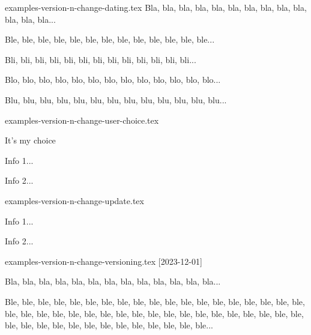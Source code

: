 

\begin{filecontents*}[overwrite]{examples-version-n-change-dating.tex}
Bla, bla, bla, bla, bla, bla, bla, bla, bla, bla, bla, bla, bla...

\medskip %


Ble, ble, ble, ble, ble, ble, ble, ble, ble, ble, ble, ble, ble...

\medskip %


Bli, bli, bli, bli, bli, bli, bli, bli, bli, bli, bli, bli, bli...

Blo, blo, blo, blo, blo, blo, blo, blo, blo, blo, blo, blo, blo...

Blu, blu, blu, blu, blu, blu, blu, blu, blu, blu, blu, blu, blu...
\end{filecontents*}


\begin{filecontents*}[overwrite]{examples-version-n-change-user-choice.tex}
\begin{tdoctopic}{It's my choice}
    \item Info 1...
    \item Info 2...
\end{tdoctopic}
\end{filecontents*}


\begin{filecontents*}[overwrite]{examples-version-n-change-update.tex}
\begin{tdocupdate}
    \item Info 1...
    \item Info 2...
\end{tdocupdate}
\end{filecontents*}


\begin{filecontents*}[overwrite]{examples-version-n-change-versioning.tex}
[2023-12-01]

Bla, bla, bla, bla, bla, bla, bla, bla, bla, bla, bla, bla, bla...

\bigskip %


Ble, ble, ble, ble, ble, ble, ble, ble, ble, ble, ble, ble, ble,
ble, ble, ble, ble, ble, ble, ble, ble, ble, ble, ble, ble, ble,
ble, ble, ble, ble, ble, ble, ble, ble, ble, ble, ble, ble, ble,
ble, ble, ble, ble, ble, ble, ble, ble, ble, ble, ble, ble...
\end{filecontents*}


